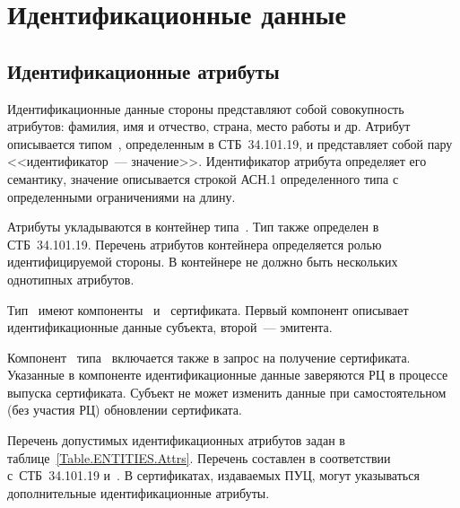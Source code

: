 \section{Идентификационные данные}\label{ENTITIES.Name}

\subsection{Идентификационные атрибуты}\label{ENTITIES.Attrs}

Идентификационные данные стороны представляют собой совокупность атрибутов:
фамилия, имя и отчество, страна, место работы и др.
%
Атрибут описывается типом~, определенным в 
СТБ~34.101.19, и представляет собой пару <<идентификатор~--- значение>>.
Идентификатор атрибута определяет его семантику, значение описывается строкой
АСН.1 определенного типа с определенными ограничениями на длину.

Атрибуты укладываются в контейнер типа~. Тип также определен в 
СТБ~34.101.19. Перечень атрибутов контейнера определяется ролью идентифицируемой
стороны. В контейнере не должно быть нескольких однотипных атрибутов.

Тип~ имеют компоненты~ и~ сертификата.
Первый компонент описывает идентификационные данные субъекта, второй~---
эмитента.

Компонент~ типа~ включается также в запрос на получение
сертификата. Указанные в компоненте идентификационные данные заверяются РЦ в
процессе выпуска сертификата. Субъект не может изменить данные при
самостоятельном (без участия РЦ) обновлении сертификата.

Перечень допустимых идентификационных атрибутов задан в
таблице~\ref{Table.ENTITIES.Attrs}. Перечень составлен в соответствии 
с~СТБ~34.101.19 и~\cite{X520}. 
%
В сертификатах, издаваемых ПУЦ, могут указываться дополнительные
идентификационные атрибуты.

